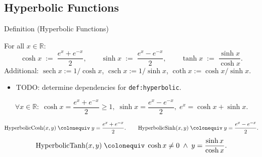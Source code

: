 
\subsection*{Hyperbolic Functions}
\label{sec:hyperbolic}

\begin{definitionbox}{Definition (Hyperbolic Functions)}
\begin{definition}
\label{def:hyperbolic}
For all $x \in \mathbb{R}$:
\[
  \cosh x \;:=\; \frac{e^x + e^{-x}}{2},
  \qquad
  \sinh x \;:=\; \frac{e^x - e^{-x}}{2},
  \qquad
  \tanh x \;:=\; \frac{\sinh x}{\cosh x}.
\]
Additional: $\operatorname{sech} x := 1/\cosh x$,\;
$\operatorname{csch} x := 1/\sinh x$,\;
$\coth x := \cosh x / \sinh x$.
\end{definition}
\end{definitionbox}

\begin{dependencies}
\begin{itemize}
  \item TODO: determine dependencies for \texttt{def:hyperbolic}.
\end{itemize}
\end{dependencies}

\begin{remark*}
\[
  \forall x \in \mathbb{R} :\;
  \cosh x = \frac{e^x + e^{-x}}{2} \geq 1,\;
  \sinh x = \frac{e^x - e^{-x}}{2},\;
  e^x = \cosh x + \sinh x.
\]
\end{remark*}

\begin{remark*}
\[
  \operatorname{HyperbolicCosh}(x,y)
  \;\colonequiv\;
  y = \frac{e^x + e^{-x}}{2}.
  \qquad
  \operatorname{HyperbolicSinh}(x,y)
  \;\colonequiv\;
  y = \frac{e^x - e^{-x}}{2}.
\]
\[
  \operatorname{HyperbolicTanh}(x,y)
  \;\colonequiv\;
  \cosh x \neq 0 \;\wedge\; y = \frac{\sinh x}{\cosh x}.
\]
\end{remark*}

